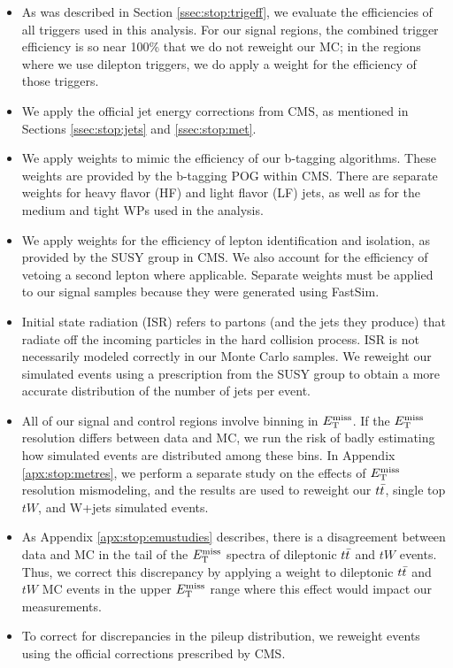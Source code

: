 \begin{itemize}
\item As was described in Section \ref{ssec:stop:trigeff}, we evaluate
  the efficiencies of all triggers used in this analysis. For our
  signal regions, the combined trigger efficiency is so near 100\% that we
  do not reweight our MC; in the regions where we use dilepton
  triggers, we do apply a weight for the efficiency of those triggers.
\item We apply the official jet energy corrections from CMS, as mentioned in
  Sections \ref{ssec:stop:jets} and \ref{ssec:stop:met}.
\item We apply weights to mimic the efficiency of our b-tagging
  algorithms. These weights are provided by the b-tagging POG within
  CMS. There are separate weights for heavy flavor (HF) and light
  flavor (LF) jets, as well as for the medium and tight WPs used in
  the analysis.
\item We apply weights for the efficiency of lepton identification and
  isolation, as provided by the SUSY group in CMS. We also account for
  the efficiency of vetoing a second lepton where applicable. Separate
  weights must be applied to our signal samples because they were
  generated using FastSim.
\item Initial state radiation (ISR) refers to partons (and the jets
  they produce) that radiate off the
  incoming particles in the hard collision process. ISR is not
  necessarily modeled correctly in our Monte Carlo samples. We
  reweight our simulated events using a prescription from the SUSY
  group to obtain a more accurate distribution of the number of jets
  per event.
\item All of our signal and control regions involve binning in
  $E_\text{T}^\text{miss}$. If the $E_\text{T}^\text{miss}$ resolution differs between data and MC, we run
  the risk of badly estimating how simulated events are distributed
  among these bins. In Appendix
  \ref{apx:stop:metres}, we perform a separate study on the effects
  of $E_\text{T}^\text{miss}$ resolution mismodeling, and the results are used to
  reweight our $t\bar{t}$, single top $tW$, and W+jets simulated events.
\item As Appendix \ref{apx:stop:emustudies} describes, there is a disagreement
  between data and MC in the tail of the $E_\text{T}^\text{miss}$ spectra of dileptonic
  $t\bar{t}$ and $tW$ events. Thus, we correct this discrepancy by
  applying a weight to dileptonic $t\bar{t}$ and $tW$ MC
  events in the upper $E_\text{T}^\text{miss}$ range where this effect would impact our measurements.
\item To correct for discrepancies in the pileup distribution, we
  reweight events using the official corrections prescribed by CMS.
\end{itemize}

